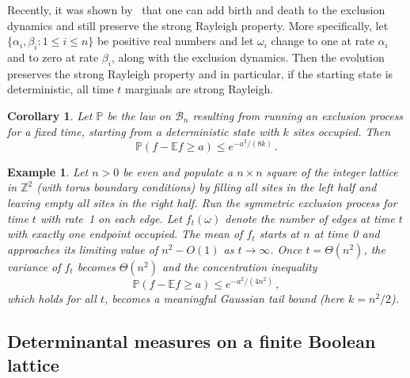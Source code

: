 \documentclass[10pt]{article}
\theoremstyle{plain}
\newtheorem{cor}[thm]{Corollary}
\newtheorem{example}[thm]{Example}
\theoremstyle{remark}
\def\Z{\mathbb{Z}}
\def\E{{\mathbb E}}
\def\P{{\mathbb P}}
\def\B{{\mathcal B}}
\begin{document}
Recently, it was shown by~\cite{wagner-BAMS} that one can add
birth and death to the exclusion dynamics and still preserve
the strong Rayleigh property.  More specifically, let $\{ \alpha_i ,
\beta_i : 1 \leq i \leq n \}$ be positive real numbers and let
$\omega_i$ change to one at rate $\alpha_i$ and to zero at rate
$\beta_i$, along with the exclusion dynamics.  Then the evolution
preserves the strong Rayleigh property and in particular, if the
starting state is deterministic, all time $t$ marginals are
strong Rayleigh.

\begin{cor} \label{cor:exclusion}
Let $\P$ be the law on $\B_n$ resulting from running
an exclusion process for a fixed time, starting from
a deterministic state with $k$ sites occupied.  Then
$$\P (f - \E f \geq a) \leq e^{- a^2 / (8 k)} \, .$$
\end{cor}

\begin{example} \label{eg:exclusion}
Let $n > 0$ be even and populate a $n \times n$ square of the
integer lattice in $\Z^2$ (with torus boundary conditions)
by filling all sites in the left half and leaving empty
all sites in the right half.  Run the symmetric exclusion
process for time $t$ with rate~1 on each edge.  Let
$f_t (\omega)$ denote the number of edges at time
$t$ with exactly one endpoint occupied.  The mean of $f_t$
starts at $n$ at time 0 and approaches its limiting value
of $n^2 - O(1)$ as $t \to \infty$.  Once $t = \Theta (n^2)$,
the variance of $f_t$ becomes $\Theta (n^2)$ and the
concentration inequality
$$\P (f - \E f \geq a) \leq e^{- a^2 / (4 n^2 )} \, ,$$
which holds for all $t$, becomes a meaningful
Gaussian tail bound (here $k = n^2 / 2$).
\end{example}


\subsection{Determinantal measures on a finite Boolean lattice}
\label{ss:finite}
\end{document}
